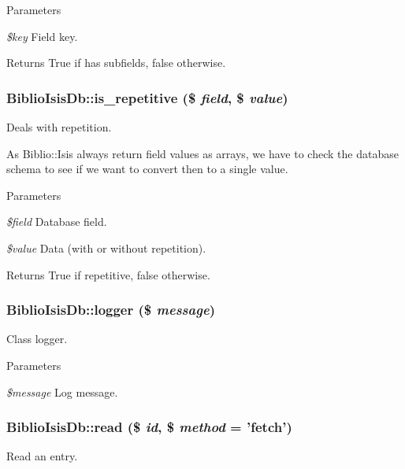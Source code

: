 \begin{DoxyParams}{Parameters}
\item[{\em \$key}]Field key.\end{DoxyParams}
\begin{DoxyReturn}{Returns}
True if has subfields, false otherwise. 
\end{DoxyReturn}
\hypertarget{classBiblioIsisDb_aa86380f9e66ea8f175c50675d1fe0a88}{
\subsubsection[{is\_\-repetitive}]{\setlength{\rightskip}{0pt plus 5cm}BiblioIsisDb::is\_\-repetitive (\$ {\em field}, \/  \$ {\em value})}}
\label{classBiblioIsisDb_aa86380f9e66ea8f175c50675d1fe0a88}
Deals with repetition.

As Biblio::Isis always return field values as arrays, we have to check the database schema to see if we want to convert then to a single value.


\begin{DoxyParams}{Parameters}
\item[{\em \$field}]Database field.\item[{\em \$value}]Data (with or without repetition).\end{DoxyParams}
\begin{DoxyReturn}{Returns}
True if repetitive, false otherwise. 
\end{DoxyReturn}
\hypertarget{classBiblioIsisDb_a286fb16de5797785d28021068efca561}{
\subsubsection[{logger}]{\setlength{\rightskip}{0pt plus 5cm}BiblioIsisDb::logger (\$ {\em message})}}
\label{classBiblioIsisDb_a286fb16de5797785d28021068efca561}
Class logger.


\begin{DoxyParams}{Parameters}
\item[{\em \$message}]Log message. \end{DoxyParams}
\hypertarget{classBiblioIsisDb_a808cdbc0d4c8f62a1465e74064f4422f}{
\subsubsection[{read}]{\setlength{\rightskip}{0pt plus 5cm}BiblioIsisDb::read (\$ {\em id}, \/  \$ {\em method} = {\ttfamily 'fetch'})}}
\label{classBiblioIsisDb_a808cdbc0d4c8f62a1465e74064f4422f}
Read an entry.


